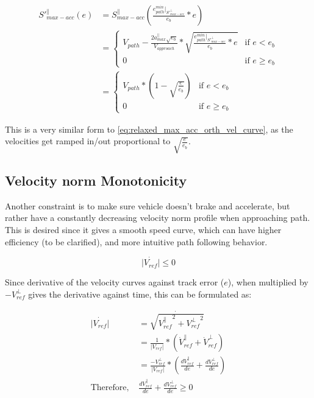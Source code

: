 \begin{equation}
\begin{split}
    {S'}^{\parallel}_{max-acc}(e) &= {S}^{\parallel}_{max-acc}(\frac{e^{min}_{path}|_{S'^{\perp}_{max-acc}}}{e_b} * e)\\
    &=\begin{cases}
        V_{path} - \frac{2a^{\parallel}_{max}\sqrt{e_b}}{V_{approach}} * \sqrt{\frac{e^{min}_{path}|_{S'^{\perp}_{max-acc}}}{e_b} * e}& \text{if $e < e_b$}\\
        0& \text{if $e \geq e_b$}
    \end{cases}\\
    &=\begin{cases}
        V_{path} * (1 - \sqrt{\frac{e}{e_b}})& \text{if $e < e_b$}\\
        0& \text{if $e \geq e_b$}
    \end{cases}
    \label{eq:relaxed_max_acc_parallel_vel_curve}
\end{split}
\end{equation}

This is a very similar form to \autoref{eq:relaxed_max_acc_orth_vel_curve}, as the velocities get ramped in/out proportional to $\sqrt{\frac{e}{e_b}}$.

\subsection{Velocity norm Monotonicity}
Another constraint is to make sure vehicle doesn't brake and accelerate, but rather have a constantly decreasing velocity norm profile when approaching path. This is desired since it gives a smooth speed curve, which can have higher efficiency (to be clarified), and more intuitive path following behavior.

\begin{equation}
    \dot{|V_{ref}|} \leq 0
\end{equation}

Since derivative of the velocity curves against track error ($e$), when multiplied by $-V^{\perp}_{ref}$ gives the derivative against time, this can be formulated as:

\begin{equation}
    \begin{split}
        \dot{|V_{ref}|} &= \dot{\sqrt{{V_{ref}^{\parallel}}^2 + {V_{ref}^{\perp}}^2}}\\
        &= \frac{1}{|V_{ref}|} * (\dot{V}_{ref}^{\parallel} + \dot{V}_{ref}^{\perp})\\
        &= \frac{-V^{\perp}_{ref}}{|V_{ref}|} * (\frac{{dV}_{ref}^{\parallel}}{de} + \frac{{dV}_{ref}^{\perp}}{de})\\
        \text{Therefore, } &\frac{{dV}_{ref}^{\parallel}}{de} + \frac{{dV}_{ref}^{\perp}}{de} \geq 0
    \end{split}
\end{equation}

